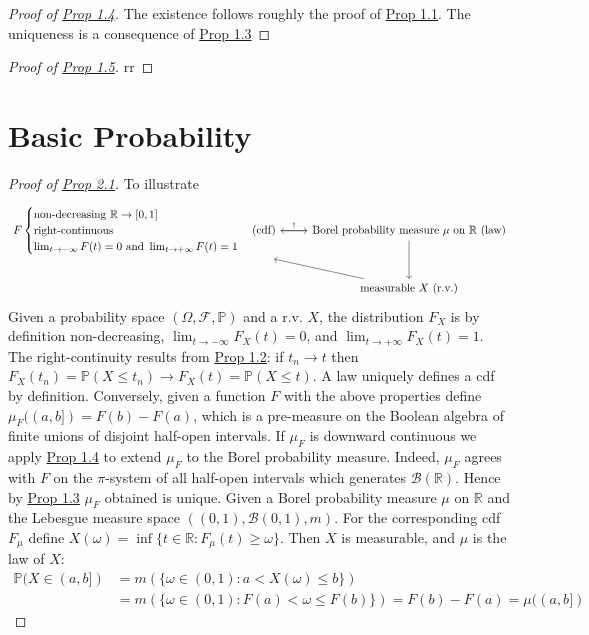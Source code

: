 \documentclass[hidelinks,11pt]{article}
\theoremstyle{definition}
\theoremstyle{dotles}
\theoremstyle{dotless}
\theoremstyle{remark}
\begin{document}
\begin{proof}[Proof of {\textup{\hyperref[Prop 1.4]{Prop 1.4}}}]
The existence follows roughly the proof of \hyperref[Prop 1.1]{Prop 1.1}. The uniqueness is a consequence of \hyperref[Prop 1.3]{Prop 1.3}
\end{proof}

\begin{proof}[Proof of {\textup{\hyperref[Prop 1.5]{Prop 1.5}}}]
rr
\end{proof}


\section{Basic Probability}

\begin{proof}[Proof of {\textup{\hyperref[Prop 2.1]{Prop 2.1}}}]
To illustrate
\[
  \begin{tikzcd}
    F\begin{cases}
\textrm{non-decreasing }\mathbb{R}\to[0,1]\\
\textrm{right-continuous}\\
\lim_{t\to-\infty}F(t)=0\textrm{ and }\lim_{t\to+\infty}F(t)=1
\end{cases}\textrm{(cdf)} \arrow{r}{!} & \textrm{Borel probability measure }\mu\textrm{ on }\mathbb{R}\textrm{ (law)}\arrow{l} \arrow{d} \\
     & \textrm{measurable }X\textrm{ (r.v.)} \arrow{ul}
  \end{tikzcd}
\]
Given a probability space $(\Omega,\mathcal{F},\mathbb{P})$ and a r.v. $X$, the distribution $F_X$ is by definition non-decreasing, $\lim_{t\to-\infty}F_X(t)=0$, and $\lim_{t\to+\infty}F_X(t)=1$. The right-continuity results from \hyperref[Prop 1.2]{Prop 1.2}: if $t_n\to t$ then
$F_X(t_n)=\mathbb{P}(X\leq t_n)\to F_X(t)=\mathbb{P}(X\leq t)$.\medbreak
A law uniquely defines a cdf by definition. Conversely, given a function $F$ with the above properties define $\mu_F((a,b])=F(b)-F(a)$, which is a pre-measure on the Boolean algebra of finite unions of disjoint half-open intervals. If $\mu_F$ is downward continuous we apply \hyperref[Prop 1.4]{Prop 1.4} to extend $\mu_F$ to the Borel probability measure. Indeed,\medbreak
$\mu_F$ agrees with $F$ on the $\pi$-system of all half-open intervals which generates $\mathcal{B}(\mathbb{R})$. Hence by \hyperref[Prop 1.3]{Prop 1.3} $\mu_F$ obtained is unique.\medbreak
Given a Borel probability measure $\mu$ on $\mathbb{R}$ and the Lebesgue measure space $((0,1),\mathcal{B}(0,1),m)$. For the corresponding cdf $F_\mu$ define $X(\omega)=\inf\{t\in\mathbb{R}:F_\mu(t)\geq\omega\}$. Then $X$ is measurable, and $\mu$ is the law of $X$:
\begin{align*}
\mathbb{P}(X\in(a,b])&=m(\{\omega\in(0,1):a<X(\omega)\leq b\})\\
&=m(\{\omega\in(0,1):F(a)<\omega\leq F(b)\})=F(b)-F(a)=\mu((a,b])
\end{align*}
\end{proof}
\end{document}
